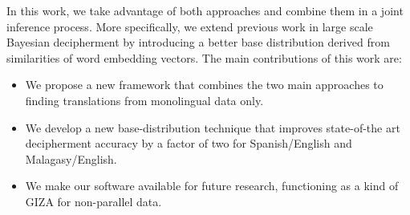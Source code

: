 In this work, we take advantage of both approaches and combine them in a joint inference process. More specifically, we extend previous work in large scale Bayesian decipherment by introducing a better base distribution derived from similarities of word embedding vectors. The main contributions of this work are:

\begin{itemize}
\item We propose a new framework that combines the two main approaches to finding translations from monolingual data only.

\item We develop a new base-distribution technique that improves state-of-the art decipherment accuracy by a factor of two for Spanish/English and Malagasy/English. 

\item We make our software available for future research, functioning as a kind of GIZA for non-parallel data.
\end{itemize}